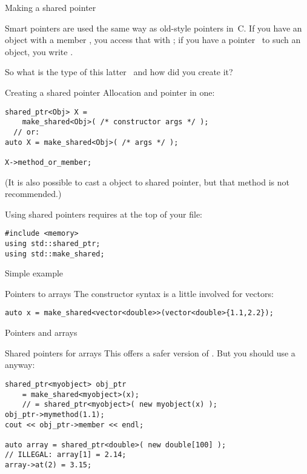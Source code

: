  {Making a shared pointer}
\label{sec:shared_ptr}

Smart pointers are used the same way as old-style pointers in~C.
If you have an
object  with a member , you access that with ; if you
have a pointer~ to such an object, you write .

So what is the type of this latter~ and how did you create it?

\begin{block}{Creating a shared pointer}
  \label{sl:make-shared}
  Allocation and pointer in one:
\begin{lstlisting}
shared_ptr<Obj> X =
    make_shared<Obj>( /* constructor args */ );
  // or:
auto X = make_shared<Obj>( /* args */ );

X->method_or_member;
\end{lstlisting}
\end{block}

(It is also possible to cast a  object to shared
pointer, but that method is not recommended.)

Using shared pointers requires at the top of your file:
\begin{lstlisting}
#include <memory>
using std::shared_ptr;
using std::make_shared;
\end{lstlisting}

\begin{block}{Simple example}
  \label{sl:shared-ptr}
\end{block}

\begin{block}{Pointers to arrays}
  \label{sl:shared-vector}
  The constructor syntax is a little involved for vectors:
\begin{lstlisting}
auto x = make_shared<vector<double>>(vector<double>{1.1,2.2});
\end{lstlisting}
\end{block}

 {Pointers and arrays}

\begin{slide}{Shared pointers for arrays}
This offers a safer version of . But you should use a
 anyway:
\begin{lstlisting}
shared_ptr<myobject> obj_ptr
    = make_shared<myobject>(x);
    // = shared_ptr<myobject>( new myobject(x) );
obj_ptr->mymethod(1.1);
cout << obj_ptr->member << endl;

auto array = shared_ptr<double>( new double[100] );
// ILLEGAL: array[1] = 2.14;
array->at(2) = 3.15;
\end{lstlisting}
\end{slide}

